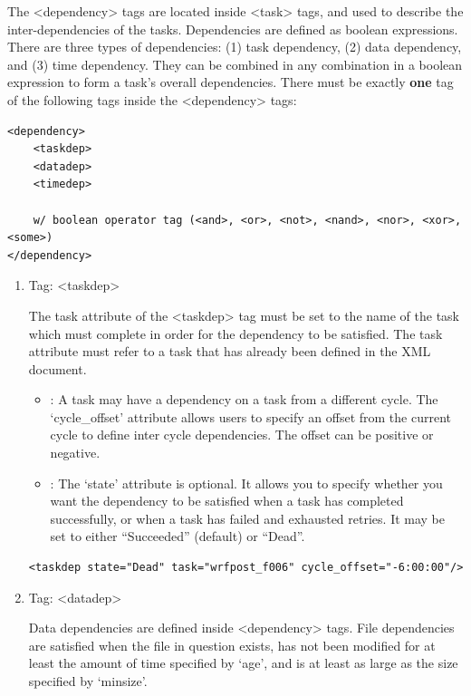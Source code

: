 \documentclass[11pt,fleqn]{report}              %
\begin{document}
\begin{enumerate}
The <dependency> tags are located inside <task> tags, and used to describe the inter-dependencies of the tasks. Dependencies are defined as boolean expressions. There are three types of dependencies: (1) task dependency, (2) data dependency, and (3) time dependency. They can be combined in any combination in a boolean expression to form a task's overall dependencies. There must be exactly {\bf one} tag of the following tags inside the <dependency> tags:

\lstset{language=XML}   
\begin{lstlisting}[frame=trBL]
<dependency>
	<taskdep> 
	<datadep>
	<timedep>
	
	w/ boolean operator tag (<and>, <or>, <not>, <nand>, <nor>, <xor>, <some>)
</dependency>
\end{lstlisting}

\begin{enumerate}
\item Tag: <taskdep>

The task attribute of the <taskdep> tag must be set to the name of the task which must complete in order for the dependency to be satisfied. The task attribute must refer to a task that has already been defined in the XML document.

\begin{itemize}
\item {: A task may have a dependency on a task from a different cycle. The `cycle\_offset' attribute allows users to specify an offset from the current cycle to define inter cycle dependencies. The offset can be positive or negative.} 

\item {: The `state' attribute is optional. It allows you to specify whether you want the dependency to be satisfied when a task has completed successfully, or when a task has failed and exhausted retries. It may be set to either ``Succeeded'' (default) or ``Dead''.} 
\end{itemize}

\lstset{language=XML}   
\begin{lstlisting}[frame=trBL]
   <taskdep state="Dead" task="wrfpost_f006" cycle_offset="-6:00:00"/>
\end{lstlisting}


\item Tag: <datadep>

Data dependencies are defined inside <dependency> tags. File dependencies are satisfied when the file in question exists, has not been modified for at least the amount of time specified by `age', and is at least as large as the size specified by `minsize'.


\end{enumerate}
\end{enumerate}
\end{document}
